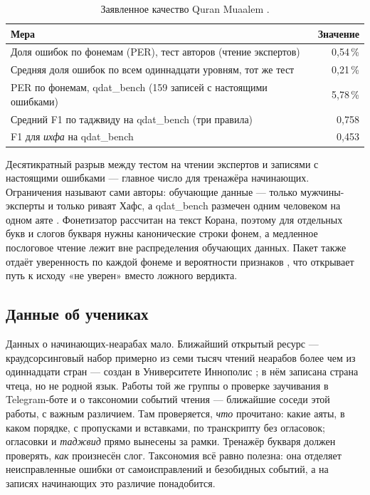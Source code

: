 \documentclass[a4paper,14pt]{extarticle}
\begin{document}
\begin{table}[ht]
\centering\small
\caption{Заявленное качество Quran Muaalem \cite{SRC-002}.}
\label{tab:muaalem-ru}
\begin{tabularx}{\linewidth}{@{}Lr@{}}
\toprule
Мера & Значение \\
\midrule
Доля ошибок по фонемам (PER), тест авторов (чтение экспертов) & 0,54\,\% \\
Средняя доля ошибок по всем одиннадцати уровням, тот же тест & 0,21\,\% \\
PER по фонемам, qdat\_bench (159 записей с настоящими ошибками) & 5,78\,\% \\
Средний F1 по таджвиду на qdat\_bench (три правила) & 0,758 \\
F1 для \emph{ихфа} на qdat\_bench & 0,453 \\
\bottomrule
\end{tabularx}
\end{table}

Десятикратный разрыв между тестом на чтении экспертов и записями с настоящими ошибками --- главное число
для тренажёра начинающих. Ограничения называют сами авторы: обучающие данные --- только мужчины-эксперты
и только риваят Хафс, а qdat\_bench размечен одним человеком на одном аяте \cite{SRC-002}. Фонетизатор
рассчитан на текст Корана, поэтому для отдельных букв и слогов букваря нужны канонические строки фонем,
а медленное послоговое чтение лежит вне распределения обучающих данных. Пакет также отдаёт уверенность
по каждой фонеме и вероятности признаков \cite{SRC-062}, что открывает путь к исходу «не уверен» вместо
ложного вердикта.

\subsection{Данные об учениках}

Данных о начинающих-неарабах мало. Ближайший открытый ресурс --- краудсорсинговый набор примерно из семи
тысяч чтений неарабов более чем из одиннадцати стран --- создан в Университете Иннополис \cite{SRC-032};
в нём записана страна чтеца, но не родной язык. Работы той же группы о проверке заучивания в Telegram-боте
\cite{SRC-067} и о таксономии событий чтения \cite{SRC-068} --- ближайшие соседи этой работы, с важным
различием. Там проверяется, \emph{что} прочитано: какие аяты, в каком порядке, с пропусками и
вставками, по транскрипту без огласовок; огласовки и \emph{таджвид} прямо вынесены за рамки. Тренажёр
букваря должен проверять, \emph{как} произнесён слог. Таксономия всё равно полезна: она отделяет
неисправленные ошибки от самоисправлений и безобидных событий, а на записях начинающих это различие
понадобится.
\end{document}
